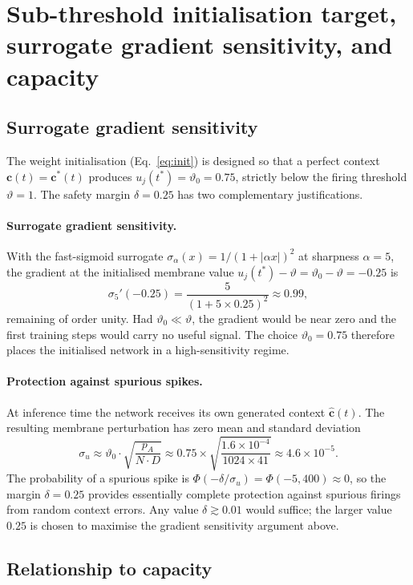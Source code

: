 \documentclass{scrartcl}
\begin{document}
\section{Sub-threshold initialisation target, surrogate gradient sensitivity, and capacity}
\label{app:margin}

\subsection{Surrogate gradient sensitivity}

The weight initialisation (Eq.~\ref{eq:init}) is designed so that a perfect context $\mathbf{c}(t) = \mathbf{c}^*(t)$ produces $u_j(t^*) = \vartheta_0 = 0.75$, strictly below the firing threshold $\vartheta = 1$. The safety margin $\delta = 0.25$ has two complementary justifications.

\paragraph{Surrogate gradient sensitivity.}
With the fast-sigmoid surrogate $\sigma_\alpha(x) = 1/(1 + |\alpha x|)^2$ at sharpness $\alpha = 5$, the gradient at the initialised membrane value $u_j(t^*) - \vartheta = \vartheta_0 - \vartheta = -0.25$ is
\[
\sigma_{5}'(-0.25) = \frac{5}{(1 + 5 \times 0.25)^2} \approx 0.99,
\]
remaining of order unity. Had $\vartheta_0 \ll \vartheta$, the gradient would be near zero and the first training steps would carry no useful signal. The choice $\vartheta_0 = 0.75$ therefore places the initialised network in a high-sensitivity regime.

\paragraph{Protection against spurious spikes.}
At inference time the network receives its own generated context $\hat{\mathbf{c}}(t)$. The resulting membrane perturbation has zero mean and standard deviation
\[
\sigma_u \approx \vartheta_0 \cdot \sqrt{\frac{p_A}{N \cdot D}} \approx 0.75 \times \sqrt{\frac{1.6\times10^{-4}}{1024 \times 41}} \approx 4.6 \times 10^{-5}.
\]
The probability of a spurious spike is $\Phi(-\delta/\sigma_u) = \Phi(-5{,}400) \approx 0$, so the margin $\delta = 0.25$ provides essentially complete protection against spurious firings from random context errors. Any value $\delta \gtrsim 0.01$ would suffice; the larger value $0.25$ is chosen to maximise the gradient sensitivity argument above.

\subsection{Relationship to capacity}
\end{document}
